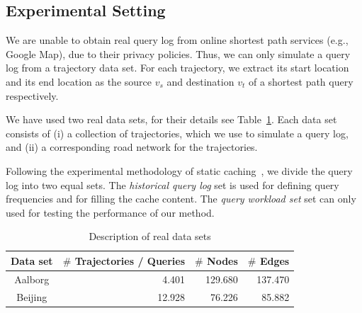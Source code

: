 



\subsection{Experimental Setting}
%
We are unable to obtain real query log from online shortest path services (e.g., Google Map), due to their privacy policies.
Thus, we can only simulate a query log from a trajectory data set.
For each trajectory, we extract its start location and its end location as the
source $v_s$ and destination $v_t$ of a shortest path query respectively.

We have used two real data sets, {\color{red} for their details see Table~\ref{tab:datasetsize}.
Each data set consists of (i) a collection of trajectories, which we use to simulate a query log}, and 
(ii) a corresponding road network for the trajectories.






Following the experimental methodology of static caching~\cite{Ozcan2011},
we divide the query log into two equal sets.
The {\em historical query log} set is used for defining query frequencies and
for filling the cache content.
The {\em query workload set} set can only used for testing the performance of our method.




\begin{table}
\center
\begin{tabular}{|c|r|r|r|}\hline
Data set & $\#$ Trajectories / Queries & $\#$ Nodes & $\#$ Edges \\\hline
Aalborg & 4.401  & 129.680 & 137.470 \\\hline
Beijing & 12.928 & 76.226 & 85.882 \\\hline
\end{tabular}
\caption{Description of real data sets}
\label{tab:datasetsize}
\end{table}


